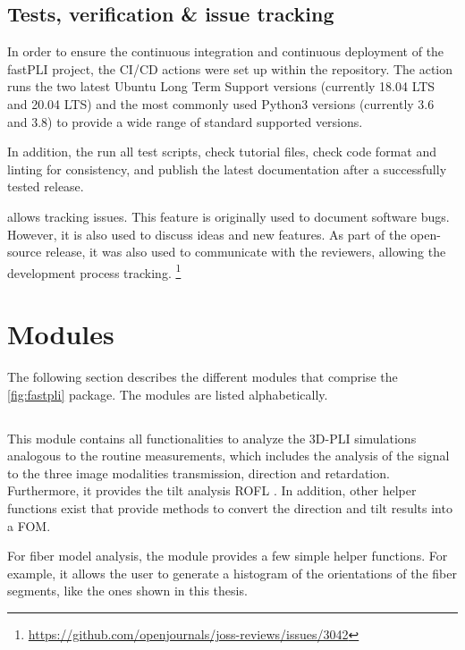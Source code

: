 \subsection{Tests, verification \& issue tracking}
%
In order to ensure the continuous integration and continuous deployment of the \ac{fastPLI} project, the CI/CD actions were set up within the  repository.
The action runs the two latest Ubuntu Long Term Support versions (currently 18.04 LTS and 20.04 LTS) and the most commonly used Python3 versions (currently 3.6 and 3.8) to provide a wide range of standard supported versions.
\par
%
In addition, the  run all test scripts, check tutorial files, check code format and linting for consistency, and publish the latest documentation after a successfully tested release.
\par
%
 allows tracking issues.
This feature is originally used to document software bugs.
However, it is also used to discuss ideas and new features.
As part of the open-source release, it was also used to communicate with the reviewers, allowing the development process tracking.
\footnote{\url{https://github.com/openjournals/joss-reviews/issues/3042}}
%
%
%
\section{Modules}
%
The following section describes the different modules that comprise the \cref{fig:fastpli} \python{} package.
The modules are listed alphabetically.
%
%
%
\subsection{}
%
This module contains all functionalities to analyze the \ac{3D-PLI} simulations analogous to the routine measurements, which includes the analysis of the signal to the three image modalities transmission, direction and retardation.
Furthermore, it provides the tilt analysis \ac{ROFL} \cite{Schmitz2018}.
In addition, other helper functions exist that provide methods to convert the direction and tilt results into a \ac{FOM}.
\par
%
For fiber model analysis, the module provides a few simple helper functions.
For example, it allows the user to generate a histogram of the orientations of the fiber segments, like the ones shown in this thesis.
%
%
%

